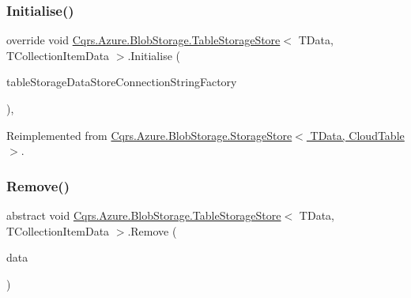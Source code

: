 \subsubsection{\texorpdfstring{Initialise()}{Initialise()}}
{\footnotesize\ttfamily override void \hyperlink{classCqrs_1_1Azure_1_1BlobStorage_1_1TableStorageStore}{Cqrs.\+Azure.\+Blob\+Storage.\+Table\+Storage\+Store}$<$ T\+Data, T\+Collection\+Item\+Data $>$.Initialise (\begin{DoxyParamCaption}\item[{\hyperlink{interfaceCqrs_1_1Azure_1_1BlobStorage_1_1IStorageStoreConnectionStringFactory}{I\+Storage\+Store\+Connection\+String\+Factory}}]{table\+Storage\+Data\+Store\+Connection\+String\+Factory }\end{DoxyParamCaption})\hspace{0.3cm}{\ttfamily [protected]}, {\ttfamily [virtual]}}



Reimplemented from \hyperlink{classCqrs_1_1Azure_1_1BlobStorage_1_1StorageStore_a8d16603267a768190f2c49ca3d1c439e_a8d16603267a768190f2c49ca3d1c439e}{Cqrs.\+Azure.\+Blob\+Storage.\+Storage\+Store$<$ T\+Data, Cloud\+Table $>$}.

\mbox{\label{classCqrs_1_1Azure_1_1BlobStorage_1_1TableStorageStore_a8e013351f5dcccd1915bf7ed6c58317e_a8e013351f5dcccd1915bf7ed6c58317e}} 
\subsubsection{\texorpdfstring{Remove()}{Remove()}}
{\footnotesize\ttfamily abstract void \hyperlink{classCqrs_1_1Azure_1_1BlobStorage_1_1TableStorageStore}{Cqrs.\+Azure.\+Blob\+Storage.\+Table\+Storage\+Store}$<$ T\+Data, T\+Collection\+Item\+Data $>$.Remove (\begin{DoxyParamCaption}\item[{T\+Collection\+Item\+Data}]{data }\end{DoxyParamCaption})\hspace{0.3cm}{\ttfamily [pure virtual]}}



